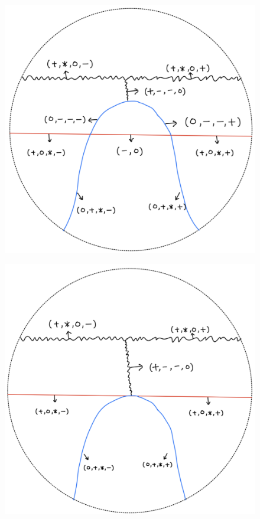 \begin{definition}
\begin{enumerate}
\begin{itemize}
\begin{figure}[H]
    \caption{}
    \label{fig:your-label}
\end{figure}
\begin{figure}[H]
    \centering
    \includegraphics[scale = 0.95]{diagrams/lemma2/14.png} 
    \caption{}
    \label{fig:your-label}
\end{figure}
\begin{figure}[H]
    \centering
    \includegraphics[scale = 0.95]{diagrams/lemma2/15.png} 

\end{figure}
\end{itemize}
\end{enumerate}
\end{definition}
